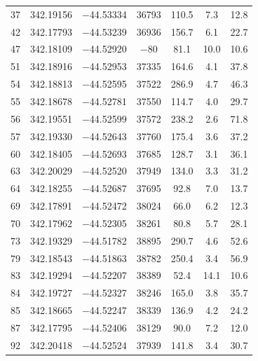 \documentclass{aa}
\begin{document}
\begin{appendix}
\begin{longtable}{c c c c c c c}
37 & 342.19156 & $-$44.53334 & 36793 & 110.5 & 7.3 & 12.8 \\
42 & 342.17793 & $-$44.53239 & 36936 & 156.7 & 6.1 & 22.7 \\
47 & 342.18109 & $-$44.52920 & $-$80 & 81.1 & 10.0 & 10.6 \\
51 & 342.18916 & $-$44.52953 & 37335 & 164.6 & 4.1 & 37.8 \\
54 & 342.18813 & $-$44.52595 & 37522 & 286.9 & 4.7 & 46.3 \\
55 & 342.18678 & $-$44.52781 & 37550 & 114.7 & 4.0 & 29.7 \\
56 & 342.19551 & $-$44.52599 & 37572 & 238.2 & 2.6 & 71.8 \\
57 & 342.19330 & $-$44.52643 & 37760 & 175.4 & 3.6 & 37.2 \\
60 & 342.18405 & $-$44.52693 & 37685 & 128.7 & 3.1 & 36.1 \\
63 & 342.20029 & $-$44.52520 & 37949 & 134.0 & 3.3 & 31.2 \\
64 & 342.18255 & $-$44.52687 & 37695 & 92.8 & 7.0 & 13.7 \\
69 & 342.17891 & $-$44.52472 & 38024 & 66.0 & 6.2 & 12.3 \\
70 & 342.17962 & $-$44.52305 & 38261 & 80.8 & 5.7 & 28.1 \\
73 & 342.19329 & $-$44.51782 & 38895 & 290.7 & 4.6 & 52.6 \\
79 & 342.18543 & $-$44.51863 & 38782 & 250.4 & 3.4 & 56.9 \\
83 & 342.19294 & $-$44.52207 & 38389 & 52.4 & 14.1 & 10.6 \\
84 & 342.19727 & $-$44.52327 & 38246 & 165.0 & 3.8 & 35.7 \\
85 & 342.18665 & $-$44.52247 & 38339 & 136.9 & 4.2 & 24.2 \\
87 & 342.17795 & $-$44.52406 & 38129 & 90.0 & 7.2 & 12.0 \\
92 & 342.20418 & $-$44.52524 & 37939 & 141.8 & 3.4 & 30.7 \\

\end{longtable}


\end{appendix}
\end{document}
